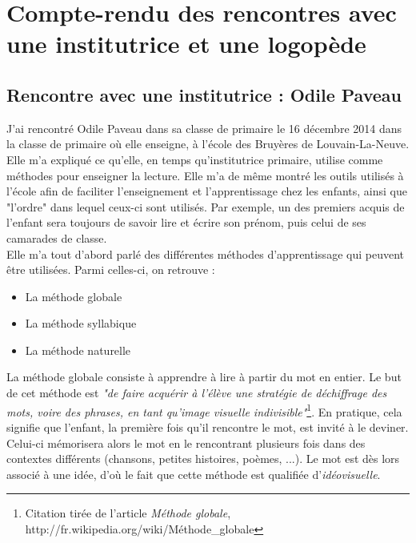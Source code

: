 \appendix
\renewcommand{\thesection}{\Roman{section}}    %
\section{Compte-rendu des rencontres avec une institutrice et une logopède \label{annexeInterview}}
\subsection{Rencontre avec une institutrice : Odile Paveau}
J'ai rencontré Odile Paveau dans sa classe de primaire le 16 décembre 2014 dans la classe de primaire où elle enseigne, à l'école des Bruyères de Louvain-La-Neuve. \\

Elle m'a expliqué ce qu'elle, en temps qu'institutrice primaire, utilise comme méthodes pour enseigner la lecture. Elle m'a de même montré les outils utilisés à l'école afin de faciliter l'enseignement et l'apprentissage chez les enfants, ainsi que "l'ordre" dans lequel ceux-ci sont utilisés. Par exemple, un des premiers acquis de l'enfant sera toujours de savoir lire et écrire son prénom, puis celui de ses camarades de classe.\\

Elle m'a tout d'abord parlé des différentes méthodes d'apprentissage qui peuvent être utilisées. Parmi celles-ci, on retrouve :
\begin{itemize}
\item La méthode globale
\item La méthode syllabique
\item La méthode naturelle\\
\end{itemize}

La méthode globale consiste à apprendre à lire à partir du mot en entier. Le but de cet méthode est \textit{"de faire acquérir à l'élève une stratégie de déchiffrage des mots, voire des phrases, en tant qu'image visuelle indivisible"}\footnote{Citation tirée de l'article \textit{Méthode globale}, http://fr.wikipedia.org/wiki/Méthode\_globale}. En pratique, cela signifie que l'enfant, la première fois qu'il rencontre le mot, est invité à le deviner. Celui-ci mémorisera alors le mot en le rencontrant plusieurs fois dans des contextes différents (chansons, petites histoires, poèmes, ...). Le mot est dès lors associé à une idée, d'où le fait que cette méthode est qualifiée d'\textit{idéovisuelle}.\\

